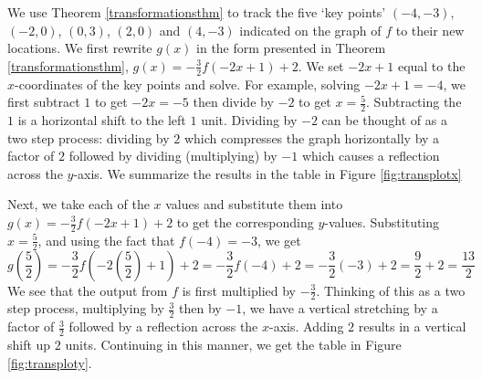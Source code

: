 {
We use Theorem \ref{transformationsthm} to track the five `key points' $(-4,-3)$, $(-2,0)$, $(0,3)$, $(2,0)$ and $(4,-3)$ indicated on the graph of $f$ to their new locations.  We first rewrite $g(x)$ in the form presented in Theorem \ref{transformationsthm}, $g(x) = -\frac{3}{2}f(-2x+1) +2$.  We set $-2x+1$ equal to the $x$-coordinates of the key points and solve.  For example, solving $-2x+1 = -4$, we first subtract $1$ to get $-2x = -5$ then divide by $-2$ to get $x = \frac{5}{2}$. Subtracting the $1$ is a horizontal shift to the left $1$ unit.  Dividing by $-2$ can be thought of as a two step process:  dividing by $2$ which compresses the graph horizontally by a factor of $2$ followed by dividing (multiplying) by $-1$ which causes a reflection across the $y$-axis.  We summarize the results in the table in Figure \ref{fig:transplotx}


Next, we take each of the $x$ values and substitute them into $g(x) = -\frac{3}{2}f(-2x+1) +2$ to get the corresponding $y$-values.  Substituting  $x=\frac{5}{2}$, and using the fact that $f(-4)=-3$, we get \[g\left(\frac{5}{2}\right) = -\frac{3}{2}f\left(-2\left(\frac{5}{2}\right) +1\right) +2 = -\frac{3}{2} f(-4) + 2 = -\frac{3}{2}(-3) + 2 = \frac{9}{2} + 2 = \frac{13}{2}\]  We see that the output from $f$ is first multiplied by $-\frac{3}{2}$.  Thinking of this as a two step process, multiplying by $\frac{3}{2}$ then by $-1$, we have  a vertical stretching by a factor of $\frac{3}{2}$ followed by a reflection across the $x$-axis.  Adding $2$ results in a vertical shift up $2$ units.  Continuing in this manner, we get the table in Figure \ref{fig:transploty}.

}
